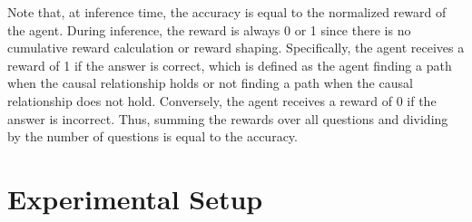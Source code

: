 Note that, at inference time, the accuracy is equal to the normalized reward of the agent.
During inference, the reward is always 0 or 1 since there is no cumulative reward 
calculation or reward shaping. Specifically, the agent receives a reward of 1 if the answer
is correct, which is defined as the agent finding a path when the causal 
relationship holds or not finding a path when the causal relationship does not hold. Conversely, the agent receives
a reward of 0 if the answer is incorrect. Thus, summing the rewards over all questions and 
dividing by the number of questions is equal to the accuracy.  


\section{Experimental Setup}
\label{sec:impl-details}

